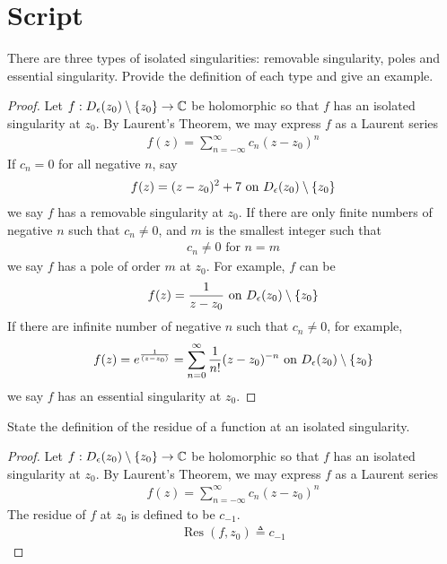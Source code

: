 \documentclass{report}
\begin{document}
\section{Script}
\begin{question}{}{}
There are three types of isolated singularities: removable singularity, poles and essential singularity. Provide the definition of each type and give an example.  
\end{question}
\begin{proof}
Let $f:D_\epsilon (z_0)\setminus \{ z_0 \}\rightarrow \mathbb{C}$ be holomorphic so that $f$ has an isolated singularity at  $z_0$. By Laurent's Theorem, we may express $f$ as a Laurent series 
\begin{align*}
f(z)= \sum_{n=-\infty}^{\infty} c_n(z-z_0)^n
\end{align*}
If $c_n=0$ for all negative $n$, say 
\begin{align*}
f(z)= (z-z_0)^2 + 7 \text{ on }D_\epsilon (z_0)\setminus \{ z_0 \}
\end{align*}
we say $f$ has a removable singularity at $z_0$. If there are only finite numbers of negative $n$ such that $c_n\neq 0$, and $m$ is the smallest integer such that
\begin{align*}
c_n \neq 0 \text{ for }n=m
\end{align*}
we say $f$ has a pole of order $m$ at $z_0$. For example, $f$ can be 
 \begin{align*}
f(z)=\frac{1}{z-z_0}\text{ on }D_\epsilon (z_0)\setminus \{ z_0 \}
\end{align*}
If there are infinite number of negative $n$ such that  $c_n \neq 0$, for example, 
\begin{align*}
f(z)= e^{\frac{1}{(z-z_0)}}= \sum_{n=0}^{\infty} \frac{1}{n!}(z-z_0)^{-n}\text{ on }D_\epsilon (z_0)\setminus \{ z_0 \}
\end{align*}
we say $f$ has an essential singularity at $z_0$. 
\end{proof}
\begin{question}{}{}
State the definition of the residue of a function at an isolated singularity. 
\end{question}
\begin{proof}
Let $f:D_\epsilon (z_0)\setminus \{ z_0 \}\rightarrow \mathbb{C}$ be holomorphic so that $f$ has an isolated singularity at  $z_0$. By Laurent's Theorem, we may express $f$ as a Laurent series 
\begin{align*}
f(z)= \sum_{n=-\infty}^{\infty} c_n(z-z_0)^n
\end{align*}
The residue of $f$ at  $z_0$ is defined to be $c_{-1}$. 
\begin{align*}
\operatorname{Res}(f,z_0)\triangleq c_{-1}
\end{align*}
\end{proof}
\end{document}
